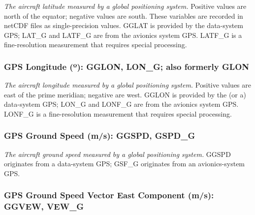 \documentclass[
  english,
]{book}
\begin{document}
\emph{The aircraft latitude measured by a global positioning system.}
Positive values are north of the equator; negative values are south.
These variables are recorded in netCDF files as single-precision values.
GGLAT is provided by the data-system GPS; LAT\_G and LATF\_G are from
the avionics system GPS. LATF\_G is a fine-resolution measurement that
requires special processing.

\hypertarget{gglon}{%
\subsubsection*{\texorpdfstring{GPS Longitude ({º}): GGLON, LON\_G; also
formerly
GLON}{GPS Longitude (º): GGLON, LON\_G; also formerly GLON}}\label{gglon}}

\emph{The aircraft longitude measured by a global positioning system.}
Positive values are east of the prime meridian; negative are west. GGLON
is provided by the (or a) data-system GPS; LON\_G and LONF\_G are from
the avionics system GPS. LONF\_G is a fine-resolution measurement that
requires special processing.

\hypertarget{ggspd}{%
\subsubsection*{GPS Ground Speed (m/s): GGSPD, GSPD\_G}\label{ggspd}}

\emph{The aircraft ground speed measured by a global positioning
system.} GGSPD originates from a data-system GPS; GSF\_G originates from
an avionics-system GPS.

\hypertarget{ggvew}{%
\subsubsection*{GPS Ground Speed Vector East Component (m/s): GGVEW,
VEW\_G}\label{ggvew}}
\end{document}

